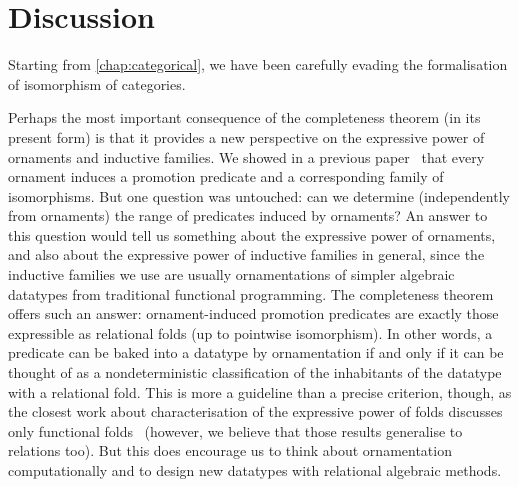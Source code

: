 \section{Discussion}
\label{sec:equivalence-discussion}


Starting from \autoref{chap:categorical}, we have been carefully evading the formalisation of isomorphism of categories.

Perhaps the most important consequence of the completeness theorem (in its present form) is that it provides a new perspective on the expressive power of ornaments and inductive families.
We showed in a previous paper~\cite{Ko-pcOrn} that every ornament induces a promotion predicate and a corresponding family of isomorphisms.
But one question was untouched: can we determine (independently from ornaments) the range of predicates induced by ornaments?
An answer to this question would tell us something about the expressive power of ornaments, and also about the expressive power of inductive families in general, since the inductive families we use are usually ornamentations of simpler algebraic datatypes from traditional functional programming.
The completeness theorem offers such an answer: ornament-induced promotion predicates are exactly those expressible as relational folds (up to pointwise isomorphism).
In other words, a predicate can be baked into a datatype by ornamentation if and only if it can be thought of as a nondeterministic classification of the inhabitants of the datatype with a relational fold.
This is more a guideline than a precise criterion, though, as the closest work about characterisation of the expressive power of folds discusses only functional folds~\cite{Gibbons-kernels}
(however, we believe that those results generalise to relations too).
But this does encourage us to think about ornamentation computationally and to design new datatypes with relational algebraic methods.
